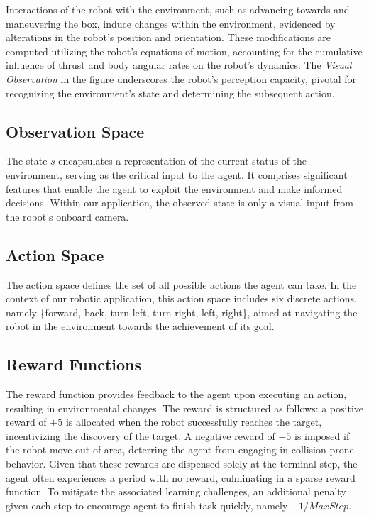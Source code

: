\documentclass{article}
\begin{document}
Interactions of the robot with the environment, such as advancing towards and maneuvering the box, induce changes within the environment, evidenced by alterations in the robot's position and orientation. These modifications are computed utilizing the robot's equations of motion, accounting for the cumulative influence of thrust and body angular rates on the robot's dynamics. The \textit{Visual Observation} in the figure underscores the robot's perception capacity, pivotal for recognizing the environment's state and determining the subsequent action.


\subsection{Observation Space}
The state \( s \) encapsulates a representation of the current status of the environment, serving as the critical input to the agent. It comprises significant features that enable the agent to exploit the environment and make informed decisions. Within our application, the observed state is only a visual input from the robot's onboard camera.

\subsection{Action Space}
The action space defines the set of all possible actions the agent can take. In the context of our robotic application, this action space includes six discrete actions, namely \{forward, back, turn-left, turn-right, left, right\}, aimed at navigating the robot in the environment towards the achievement of its goal.

\subsection{Reward Functions}
The reward function provides feedback to the agent upon executing an action, resulting in environmental changes. The reward is structured as follows: a positive reward of \( +5 \) is allocated when the robot successfully reaches the target, incentivizing the discovery of the target. A negative reward of \( -5 \) is imposed if the robot move out of area, deterring the agent from engaging in collision-prone behavior.
Given that these rewards are dispensed solely at the terminal step, the agent often experiences a period with no reward, culminating in a sparse reward function. To mitigate the associated learning challenges, an additional penalty given each step to encourage agent to finish task quickly, namely $-1 / MaxStep$.
\end{document}

